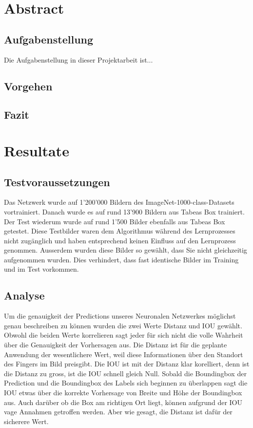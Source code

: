 \documentclass[a4paper,12pt]{article}
\begin{document}
\newpage
\tableofcontents
\listoffigures

\newpage
\section{Abstract}
\subsection{Aufgabenstellung}
Die Aufgabenstellung in dieser Projektarbeit ist...
\subsection{Vorgehen}
\subsection{Fazit}


\newpage
\section{Resultate}

\subsection{Testvoraussetzungen}
Das Netzwerk wurde auf 1'200'000 Bildern des ImageNet-1000-class-Datasets vortrainiert.
Danach wurde es auf rund 13'900 Bildern aus Tabeas Box trainiert. 
Der Test wiederum wurde auf rund 1'500 Bilder ebenfalls aus Tabeas Box getestet. 
Diese Testbilder waren dem Algorithmus während des Lernprozesses nicht zugänglich und haben entsprechend keinen Einfluss auf den Lernprozess genommen. 
Ausserdem wurden diese Bilder so gewählt, dass Sie nicht gleichzeitig aufgenommen wurden. 
Dies verhindert, dass fast identische Bilder im Training und im Test vorkommen. 

\subsection{Analyse}
Um die genauigkeit der Predictions unseres Neuronalen Netzwerkes möglichst genau beschreiben zu können wurden die zwei Werte Distanz und IOU gewählt. 
Obwohl die beiden Werte korrelieren sagt jeder für sich nicht die volle Wahrheit über die Genauigkeit der Vorhersagen aus. 
Die Distanz ist für die geplante Anwendung der wesentlichere Wert, weil diese Informationen über den Standort des Fingers im Bild preisgibt.
Die IOU ist mit der Distanz klar korelliert, denn ist die Distanz zu gross, ist die IOU schnell gleich Null. 
Sobald die Boundingbox der Prediction und die Boundingbox des Labels sich beginnen zu überlappen sagt die IOU etwas über die korrekte Vorhersage von Breite und Höhe der Boundingbox aus. Auch darüber ob die Box am richtigen Ort liegt, können aufgrund der IOU vage Annahmen getroffen werden. Aber wie gesagt, die Distanz ist dafür der sicherere Wert. 
\end{document}
